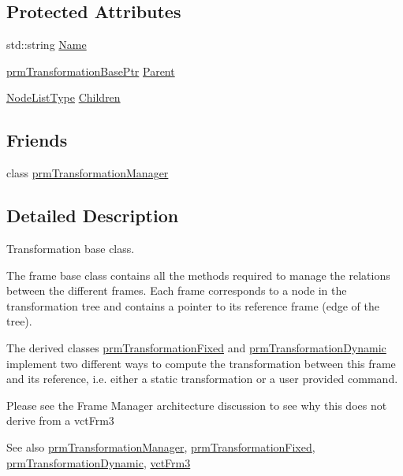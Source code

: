 \subsection*{Protected Attributes}
\begin{DoxyCompactItemize}
\item 
std\+::string \hyperlink{classprm_transformation_base_a4f96f394eb3f9d40077d8bc5825de87d}{Name}
\item 
\hyperlink{prm_transformation_base_8h_a881a6a7d2191474974cdf36d79e1df08}{prm\+Transformation\+Base\+Ptr} \hyperlink{classprm_transformation_base_a628228ce0f8caa0e5d7a46a61d3b548d}{Parent}
\item 
\hyperlink{classprm_transformation_base_a577eae3ee032e09a9ebb774081828d5c}{Node\+List\+Type} \hyperlink{classprm_transformation_base_affad35a2bd40ca707368739d300a7f76}{Children}
\end{DoxyCompactItemize}
\subsection*{Friends}
\begin{DoxyCompactItemize}
\item 
class \hyperlink{classprm_transformation_base_af7fc0618e84bdf8b1d22bc2635f29eea}{prm\+Transformation\+Manager}
\end{DoxyCompactItemize}


\subsection{Detailed Description}
Transformation base class. 

The frame base class contains all the methods required to manage the relations between the different frames. Each frame corresponds to a node in the transformation tree and contains a pointer to its reference frame (edge of the tree).

The derived classes \hyperlink{classprm_transformation_fixed}{prm\+Transformation\+Fixed} and \hyperlink{classprm_transformation_dynamic}{prm\+Transformation\+Dynamic} implement two different ways to compute the transformation between this frame and its reference, i.\+e. either a static transformation or a user provided command.

Please see the Frame Manager architecture discussion to see why this does not derive from a vct\+Frm3

\begin{DoxySeeAlso}{See also}
\hyperlink{classprm_transformation_manager}{prm\+Transformation\+Manager}, \hyperlink{classprm_transformation_fixed}{prm\+Transformation\+Fixed}, \hyperlink{classprm_transformation_dynamic}{prm\+Transformation\+Dynamic}, \hyperlink{vct_transformation_types_8h_a81feda0a02c2d1bc26e5553f409fed20}{vct\+Frm3} 
\end{DoxySeeAlso}


